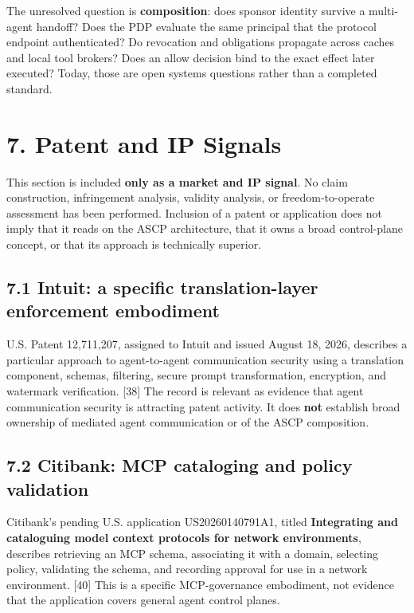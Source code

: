 \documentclass[
  10pt,
  letterpaper,
]{article}
\begin{document}
The unresolved question is \textbf{composition}: does sponsor identity
survive a multi-agent handoff? Does the PDP evaluate the same principal
that the protocol endpoint authenticated? Do revocation and obligations
propagate across caches and local tool brokers? Does an allow decision
bind to the exact effect later executed? Today, those are open systems
questions rather than a completed standard.

\section{7. Patent and IP Signals}\label{patent-and-ip-signals}

This section is included \textbf{only as a market and IP signal}. No
claim construction, infringement analysis, validity analysis, or
freedom-to-operate assessment has been performed. Inclusion of a patent
or application does not imply that it reads on the ASCP architecture,
that it owns a broad control-plane concept, or that its approach is
technically superior.

\subsection{7.1 Intuit: a specific translation-layer enforcement
embodiment}\label{intuit-a-specific-translation-layer-enforcement-embodiment}

U.S. Patent 12,711,207, assigned to Intuit and issued August 18, 2026,
describes a particular approach to agent-to-agent communication security
using a translation component, schemas, filtering, secure prompt
transformation, encryption, and watermark verification. {[}38{]} The
record is relevant as evidence that agent communication security is
attracting patent activity. It does \textbf{not} establish broad
ownership of mediated agent communication or of the ASCP composition.

\subsection{7.2 Citibank: MCP cataloging and policy
validation}\label{citibank-mcp-cataloging-and-policy-validation}

Citibank's pending U.S. application US20260140791A1, titled
\textbf{Integrating and cataloguing model context protocols for network
environments}, describes retrieving an MCP schema, associating it with a
domain, selecting policy, validating the schema, and recording approval
for use in a network environment. {[}40{]} This is a specific
MCP-governance embodiment, not evidence that the application covers
general agent control planes.
\end{document}
